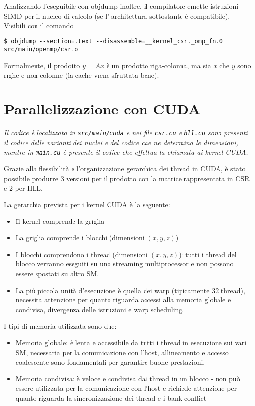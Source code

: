 \documentclass[a4paper,9pt]{extarticle}
\begin{document}
Analizzando l'eseguibile con objdump inoltre, il compilatore emette istruzioni SIMD per il nucleo di calcolo (se l'
architettura sottostante è compatibile). Visibili con il comando
\begin{lstlisting}
$ objdump --section=.text --disassemble=__kernel_csr._omp_fn.0 src/main/openmp/csr.o
\end{lstlisting}

Formalmente, il prodotto $y = Ax$ è un prodotto riga-colonna, ma sia $x$ che $y$ sono righe e non colonne (la cache
viene sfruttata bene).

\section{Parallelizzazione con CUDA}
\textit{Il codice è localizzato in \texttt{src/main/cuda} e nei file \texttt{csr.cu} e \texttt{hll.cu} sono presenti il
codice delle varianti dei nuclei e del codice che ne determina le dimensioni, mentre in \texttt{main.cu} è presente
il codice che effettua la chiamata ai kernel CUDA.}

Grazie alla flessibilità e l'organizzazione gerarchica dei thread in CUDA, è stato possibile produrre 3 versioni per il 
prodotto con la matrice rappresentata in CSR e 2 per HLL.

La gerarchia prevista per i kernel CUDA è la seguente:
\begin{itemize}
	\item Il kernel comprende la griglia
	\item La griglia comprende i blocchi (dimensioni $(x,y,z)$)
	\item I blocchi comprendono i thread (dimensioni $(x,y,z)$): 
	tutti i thread del blocco verranno eseguiti su uno streaming multiprocessor e non possono essere spostati su altro SM.
	\item La più piccola unità d'esecuzione è quella dei warp (tipicamente 32 thread), necessita attenzione per quanto
	riguarda accessi alla memoria globale e condivisa, divergenza delle istruzioni e warp scheduling.
\end{itemize}

I tipi di memoria utilizzata sono due:
\begin{itemize}
	\item Memoria globale: è lenta e accessibile da tutti i thread in esecuzione sui vari SM, necessaria per la
	comunicazione con l'host, allineamento e accesso coalescente sono fondamentali per garantire
	buone prestazioni.
	
	\item Memoria condivisa: è veloce e condivisa dai thread in un blocco - non può essere utilizzata per la comunicazione
	con l'host e richiede attenzione per quanto riguarda la sincronizzazione dei thread e i 
	bank conflict
\end{itemize}
	
\end{document}
